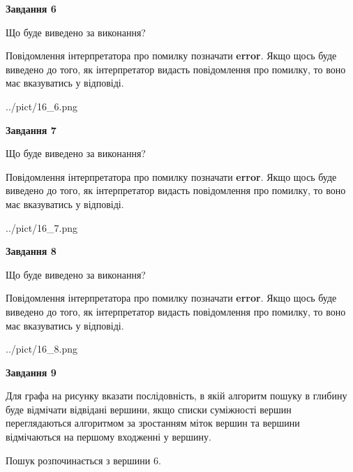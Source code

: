 \documentclass[12pt, ukrainian]{article}
\begin{document}
{\begin {large}
{\begin {center}\textbf{Завдання 6}\end {center}}\par
Що буде виведено за виконання?

Повідомлення інтерпретатора про помилку позначати \textbf{error}.
Якщо щось буде виведено до того, як інтерпретатор видасть повідомлення про помилку, 
то воно має вказуватись у відповіді. \par


\begin{center}
	{../pict/16_6.png}
\end{center}
\newpage

{\begin {center}\textbf{Завдання 7}\end {center}}\par
Що буде виведено за виконання?

Повідомлення інтерпретатора про помилку позначати \textbf{error}.
Якщо щось буде виведено до того, як інтерпретатор видасть повідомлення про помилку, 
то воно має вказуватись у відповіді. \par


\begin{center}
	{../pict/16_7.png}
\end{center}
\newpage

{\begin {center}\textbf{Завдання 8}\end {center}}\par
Що буде виведено за виконання?

Повідомлення інтерпретатора про помилку позначати \textbf{error}.
Якщо щось буде виведено до того, як інтерпретатор видасть повідомлення про помилку, 
то воно має вказуватись у відповіді. \par


\begin{center}
	{../pict/16_8.png}
\end{center}
\newpage

{\begin {center}\textbf{Завдання 9}\end {center}}\par
Для графа на рисунку вказати послідовність, в якій алгоритм пошуку в глибину буде відмічати відвідані вершини, якщо списки суміжності вершин переглядаються алгоритмом за зростанням міток вершин та вершини відмічаються на першому вход\-женні у вершину.\par
Пошук розпочинається з вершини 6.\par


\end{large}}
\end{document}
